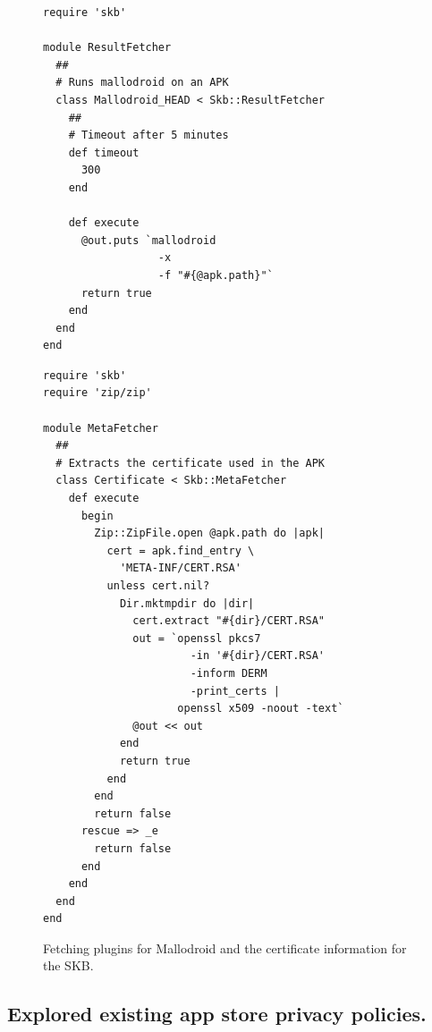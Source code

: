 \documentclass[a4paper]{scrartcl}
\begin{document}
\begin{figure}\centering
  \lstset{language=ruby,
          basicstyle  =\scriptsize\ttfamily,
          keywordstyle=\scriptsize\bfseries\ttfamily,
          stringstyle =\scriptsize\sffamily,
          commentstyle=\scriptsize\slshape\ttfamily}
  \begin{minipage}{0.48\linewidth}
    \begin{lstlisting}
require 'skb'

module ResultFetcher
  ##
  # Runs mallodroid on an APK
  class Mallodroid_HEAD < Skb::ResultFetcher
    ##
    # Timeout after 5 minutes
    def timeout
      300
    end

    def execute
      @out.puts `mallodroid
                  -x
                  -f "#{@apk.path}"`
      return true
    end
  end
end
    \end{lstlisting}
  \end{minipage}
  \begin{minipage}{0.48\linewidth}
    \begin{lstlisting}
require 'skb'
require 'zip/zip'

module MetaFetcher
  ##
  # Extracts the certificate used in the APK
  class Certificate < Skb::MetaFetcher
    def execute
      begin
        Zip::ZipFile.open @apk.path do |apk|
          cert = apk.find_entry \
            'META-INF/CERT.RSA'
          unless cert.nil?
            Dir.mktmpdir do |dir|
              cert.extract "#{dir}/CERT.RSA"
              out = `openssl pkcs7
                       -in '#{dir}/CERT.RSA'
                       -inform DERM
                       -print_certs |
                     openssl x509 -noout -text`
              @out << out
            end
            return true
          end
        end
        return false
      rescue => _e
        return false
      end
    end
  end
end
    \end{lstlisting}
  \end{minipage}
  \caption{Fetching plugins for Mallodroid and the certificate information for the \ac{SKB}.}
  \label{fig:fetcher}
\end{figure}

\subsection{Explored existing app store privacy policies.}
\end{document}
